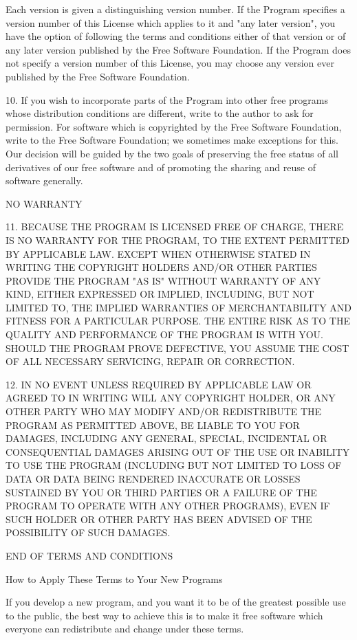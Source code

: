 \documentclass{doc}
\begin{document}
Each version is given a distinguishing version number.  If the Program
specifies a version number of this License which applies to it and "any
later version", you have the option of following the terms and conditions
either of that version or of any later version published by the Free
Software Foundation.  If the Program does not specify a version number of
this License, you may choose any version ever published by the Free Software
Foundation.

  10. If you wish to incorporate parts of the Program into other free
programs whose distribution conditions are different, write to the author
to ask for permission.  For software which is copyrighted by the Free
Software Foundation, write to the Free Software Foundation; we sometimes
make exceptions for this.  Our decision will be guided by the two goals
of preserving the free status of all derivatives of our free software and
of promoting the sharing and reuse of software generally.

			    NO WARRANTY

  11. BECAUSE THE PROGRAM IS LICENSED FREE OF CHARGE, THERE IS NO WARRANTY
FOR THE PROGRAM, TO THE EXTENT PERMITTED BY APPLICABLE LAW.  EXCEPT WHEN
OTHERWISE STATED IN WRITING THE COPYRIGHT HOLDERS AND/OR OTHER PARTIES
PROVIDE THE PROGRAM "AS IS" WITHOUT WARRANTY OF ANY KIND, EITHER EXPRESSED
OR IMPLIED, INCLUDING, BUT NOT LIMITED TO, THE IMPLIED WARRANTIES OF
MERCHANTABILITY AND FITNESS FOR A PARTICULAR PURPOSE.  THE ENTIRE RISK AS
TO THE QUALITY AND PERFORMANCE OF THE PROGRAM IS WITH YOU.  SHOULD THE
PROGRAM PROVE DEFECTIVE, YOU ASSUME THE COST OF ALL NECESSARY SERVICING,
REPAIR OR CORRECTION.

  12. IN NO EVENT UNLESS REQUIRED BY APPLICABLE LAW OR AGREED TO IN WRITING
WILL ANY COPYRIGHT HOLDER, OR ANY OTHER PARTY WHO MAY MODIFY AND/OR
REDISTRIBUTE THE PROGRAM AS PERMITTED ABOVE, BE LIABLE TO YOU FOR DAMAGES,
INCLUDING ANY GENERAL, SPECIAL, INCIDENTAL OR CONSEQUENTIAL DAMAGES ARISING
OUT OF THE USE OR INABILITY TO USE THE PROGRAM (INCLUDING BUT NOT LIMITED
TO LOSS OF DATA OR DATA BEING RENDERED INACCURATE OR LOSSES SUSTAINED BY
YOU OR THIRD PARTIES OR A FAILURE OF THE PROGRAM TO OPERATE WITH ANY OTHER
PROGRAMS), EVEN IF SUCH HOLDER OR OTHER PARTY HAS BEEN ADVISED OF THE
POSSIBILITY OF SUCH DAMAGES.

		     END OF TERMS AND CONDITIONS

	    How to Apply These Terms to Your New Programs

  If you develop a new program, and you want it to be of the greatest
possible use to the public, the best way to achieve this is to make it
free software which everyone can redistribute and change under these terms.
\end{document}
